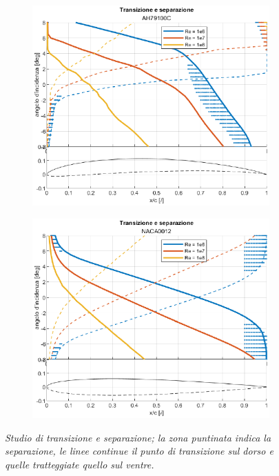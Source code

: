 \documentclass{jfm}
\begin{document}
\begin{figure}
\centering
    \begin{subfigure}{0.5\textwidth}
    \centering
        \includegraphics[width=\linewidth]{./figures/AH79100C.eps}
    \end{subfigure}%
    \begin{subfigure}{0.5\textwidth}
    \centering
        \includegraphics[width=\linewidth]{./figures/NACA0012.eps}
    \end{subfigure}
    \caption{\textit{Studio di transizione e separazione; la zona puntinata indica la separazione, le linee continue il punto di transizione sul dorso e quelle tratteggiate quello sul ventre.}}
    \label{fig:separazione}
\end{figure}
\end{document}
